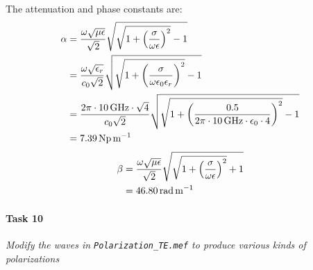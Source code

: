 The attenuation and phase constants are:
\begin{align*}
	\alpha &= { \omega \sqrt{\mu \epsilon} \over \sqrt{2} } \sqrt{\sqrt{1 + \left( {\sigma \over \omega \epsilon} \right)^2} - 1} \\
	&= { \omega \sqrt{\epsilon_r} \over c_0 \sqrt{2} } \sqrt{\sqrt{1 + \left( {\sigma \over \omega \epsilon_0 \epsilon_r} \right)^2} - 1} \\
	&= { 2 \pi \cdot \SI{10}{\giga\hertz} \cdot \sqrt{4} \over c_0 \sqrt{2} } \sqrt{\sqrt{1 + \left( {0.5 \over 2 \pi \cdot \SI{10}{\giga\hertz} \cdot \epsilon_0 \cdot 4} \right)^2} - 1} \\
	&= \SI{7.39}{\neper\per\meter}
\end{align*}
\begin{align*}
	\beta &= { \omega \sqrt{\mu \epsilon} \over \sqrt{2} } \sqrt{\sqrt{1 + \left( {\sigma \over \omega \epsilon} \right)^2} + 1} \\
	&= \SI{46.80}{\radian\per\meter}
\end{align*}

\paragraph{Task 10} \textit{Modify the waves in \texttt{Polarization\_TE.mef} to produce various kinds of polarizations}

